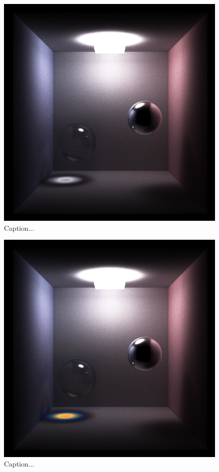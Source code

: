 \documentclass[12pt]{article}
\begin{document}
\begin{figure} 
\centering
  \includegraphics[width = 6 in]{v_rt_reflect_no_chromatic_aberration_low_res.png}
  \caption{ Caption...
}
\end{figure}


\begin{figure} 
\centering
  \includegraphics[width = 6 in]{v_rt_reflect_chromatic_aberration_low_res.png}
  \caption{ Caption...
}
\end{figure}
\end{document}
